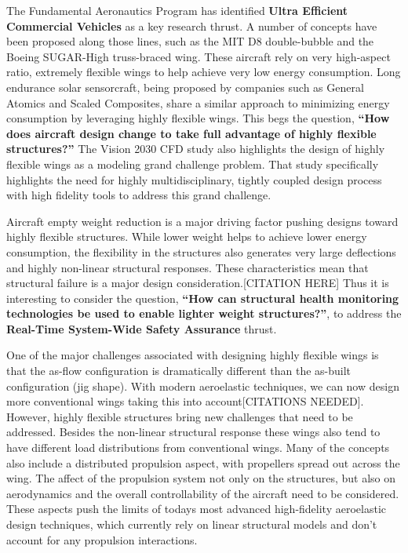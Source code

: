 \documentclass[]{aiaa-tc}
\begin{document}
    The Fundamental Aeronautics Program has identified \textbf{Ultra Efficient Commercial Vehicles} as 
    a key research thrust. A number of concepts have been proposed along those lines, such as 
    the MIT D8 double­-bubble and the Boeing SUGAR­-High truss­-braced wing. These aircraft rely on 
    very high­-aspect ratio, extremely flexible wings to help achieve very low energy consumption. 
    Long endurance solar sensorcraft, being proposed by companies such as General Atomics and 
    Scaled Composites, share a similar approach to minimizing energy consumption by leveraging highly 
    flexible wings. This begs the question, \textbf{``How does aircraft design change to take full 
    advantage of highly flexible structures?''} The Vision 2030 CFD study also highlights the 
    design of highly flexible wings as a modeling grand challenge problem. That study specifically 
    highlights the need for highly multidisciplinary, tightly coupled design process with high 
    fidelity tools to address this grand challenge.

    Aircraft empty weight reduction is a major driving factor pushing designs toward highly flexible structures. 
    While lower weight helps to achieve lower energy consumption, the flexibility in the structures also 
    generates very large deflections and highly non-linear structural responses. These characteristics mean that 
    structural failure is a major design consideration.[CITATION HERE] Thus it is interesting to consider the question, 
    \textbf{``How can structural health monitoring technologies be used to enable lighter 
    weight structures?''}, to address the \textbf{Real­-Time System­-Wide Safety Assurance} thrust. 

    One of the major challenges associated with designing highly flexible wings is that the as-flow configuration 
    is dramatically different than the as-built configuration (jig shape). With modern aeroelastic techniques, 
    we can now design more conventional wings taking this into account[CITATIONS NEEDED]. However, highly flexible
    structures bring new challenges that need to be addressed. Besides the non-linear structural 
    response these wings also tend to have different load distributions from conventional wings. Many of the concepts 
    also include a distributed propulsion aspect, with propellers spread out across the wing. The affect of the 
    propulsion system not only on the structures, but also on aerodynamics and the overall controllability 
    of the aircraft need to be considered. These aspects push the 
    limits of todays most advanced high-fidelity aeroelastic design techniques, which currently rely on linear structural 
    models and don't account for any propulsion interactions. 
\end{document}
